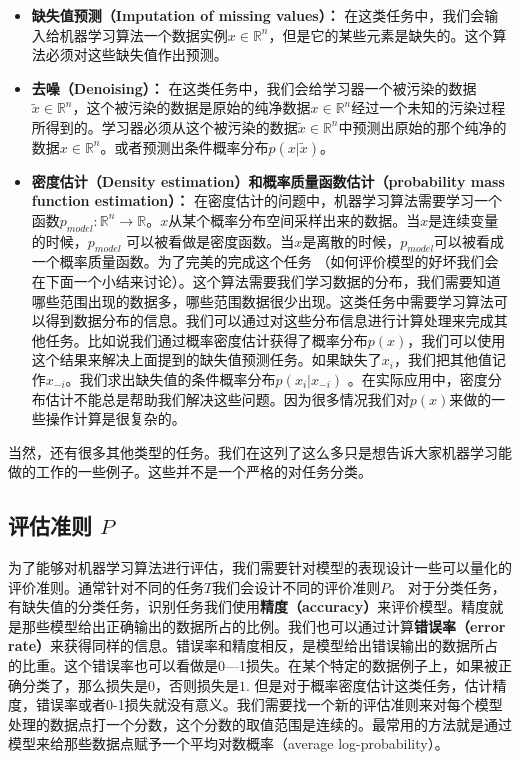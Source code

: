 \begin{itemize}
\item \textbf{缺失值预测（Imputation of missing values）：} 在这类任务中，我们会输入给机器学习算法一个数据实例$x\in \mathbb{R}^{n}$，但是它的某些元素是缺失的。这个算法必须对这些缺失值作出预测。

\item \textbf{去噪（Denoising）：} 在这类任务中，我们会给学习器一个被污染的数据$\widetilde{x}\in \mathbb{R}^{n}$，这个被污染的数据是原始的纯净数据$x\in \mathbb{R}^{n}$经过一个未知的污染过程所得到的。学习器必须从这个被污染的数据$\widetilde{x}\in \mathbb{R}^{n}$中预测出原始的那个纯净的数据$x\in \mathbb{R}^{n}$。或者预测出条件概率分布$p(x|\widetilde{x})$。

\item \textbf{密度估计（Density estimation）和概率质量函数估计（probability mass function estimation）：} 在密度估计的问题中，机器学习算法需要学习一个函数$p_{model}:\mathbb{R}^{n}\rightarrow \mathbb{R}$。$x$从某个概率分布空间采样出来的数据。当$x$是连续变量的时候，$p_{model}$ 可以被看做是密度函数。当$x$是离散的时候，$p_{model}$可以被看成一个概率质量函数。为了完美的完成这个任务 （如何评价模型的好坏我们会在下面一个小结来讨论）。这个算法需要我们学习数据的分布，我们需要知道哪些范围出现的数据多，哪些范围数据很少出现。这类任务中需要学习算法可以得到数据分布的信息。我们可以通过对这些分布信息进行计算处理来完成其他任务。比如说我们通过概率密度估计获得了概率分布$p(x)$，我们可以使用这个结果来解决上面提到的缺失值预测任务。如果缺失了$x_i$，我们把其他值记作$x_{-i}$。我们求出缺失值的条件概率分布$p(x_i|x_{-i})$ 。在实际应用中，密度分布估计不能总是帮助我们解决这些问题。因为很多情况我们对$p(x)$来做的一些操作计算是很复杂的。
\end{itemize}

当然，还有很多其他类型的任务。我们在这列了这么多只是想告诉大家机器学习能做的工作的一些例子。这些并不是一个严格的对任务分类。


\subsection{评估准则 $P$}
\label{sec:5.1.2}
为了能够对机器学习算法进行评估，我们需要针对模型的表现设计一些可以量化的评价准则。通常针对不同的任务$T$我们会设计不同的评价准则$P$。
对于分类任务，有缺失值的分类任务，识别任务我们使用\textbf{精度（accuracy）}来评价模型。精度就是那些模型给出正确输出的数据所占的比例。我们也可以通过计算\textbf{错误率（error rate）}来获得同样的信息。错误率和精度相反，是模型给出错误输出的数据所占的比重。这个错误率也可以看做是0—1损失。在某个特定的数据例子上，如果被正确分类了，那么损失是$0$，否则损失是$1$. 但是对于概率密度估计这类任务，估计精度，错误率或者0-1损失就没有意义。我们需要找一个新的评估准则来对每个模型处理的数据点打一个分数，这个分数的取值范围是连续的。最常用的方法就是通过模型来给那些数据点赋予一个平均对数概率（average log-probability）。

